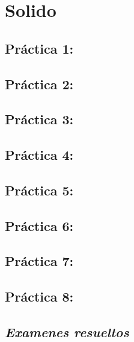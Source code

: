\chapter{Solido}

\section{Práctica 1: }
\section{Práctica 2: }
\section{Práctica 3: }
\section{Práctica 4: }
\section{Práctica 5: }
\section{Práctica 6: }
\section{Práctica 7: }
\section{Práctica 8: }



\newpage

\section*{\textit{Examenes resueltos}}


